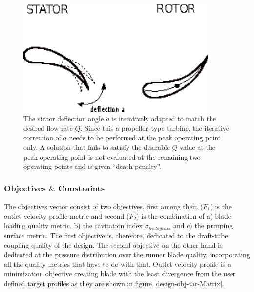 \begin{figure}[h!]
\centering
\includegraphics[width=100mm]{stator.eps}    
\caption{
The stator deflection angle $a$ is iteratively adapted to match the desired flow rate $Q$. Since this a propeller--type turbine, the iterative correction of $a$ needs to be performed at the peak operating point only. A solution that fails to satisfy the desirable $Q$ value at the peak operating point is not evaluated at the remaining two operating points and is given ``death penalty''.}
\label{Matrix_stator}
\end{figure}

\subsubsection{Objectives $\&$ Constraints}

The objectives vector consist of two objectives, first among them ($F_1$) is the outlet velocity profile metric and second ($F_2$) is the combination of a) blade loading quality metric, b) the cavitation index $\sigma_{histogram}$ and c) the pumping surface metric. The first objective is, therefore, dedicated to the draft-tube coupling quality of the design. The second objective on the other hand is dedicated at the pressure distribution over the runner blade quality, incorporating all the quality metrics that have to do with that. Outlet velocity profile is  a minimization objective creating blade with the least divergence from the user defined target profiles as they are shown in figure \ref{design-obj-tar-Matrix}. 

